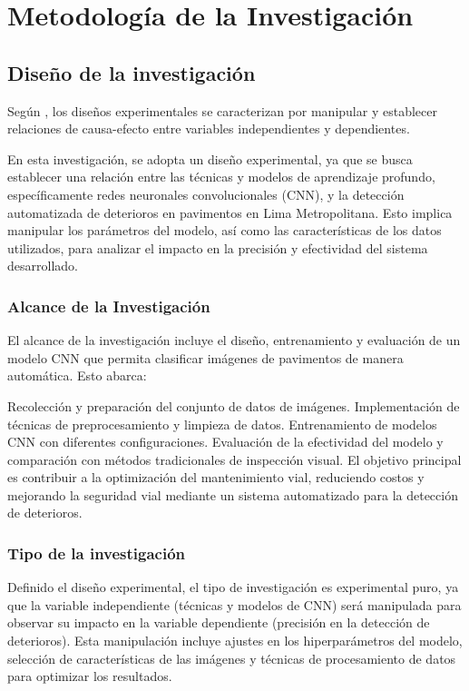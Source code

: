 \chapter{Metodología de la Investigación}



\section{Diseño de la investigación}

Según \cite{bk_sampieri2014metodologia}, los diseños experimentales se caracterizan por manipular y establecer relaciones de causa-efecto entre variables independientes y dependientes.

En esta investigación, se adopta un diseño experimental, ya que se busca establecer una relación entre las técnicas y modelos de aprendizaje profundo, específicamente redes neuronales convolucionales (CNN), y la detección automatizada de deterioros en pavimentos en Lima Metropolitana. Esto implica manipular los parámetros del modelo, así como las características de los datos utilizados, para analizar el impacto en la precisión y efectividad del sistema desarrollado.

\subsection{Alcance de la Investigación}

El alcance de la investigación incluye el diseño, entrenamiento y evaluación de un modelo CNN que permita clasificar imágenes de pavimentos de manera automática. Esto abarca:

Recolección y preparación del conjunto de datos de imágenes.
Implementación de técnicas de preprocesamiento y limpieza de datos.
Entrenamiento de modelos CNN con diferentes configuraciones.
Evaluación de la efectividad del modelo y comparación con métodos tradicionales de inspección visual.
El objetivo principal es contribuir a la optimización del mantenimiento vial, reduciendo costos y mejorando la seguridad vial mediante un sistema automatizado para la detección de deterioros.



\subsection{Tipo de la investigación}

Definido el diseño experimental, el tipo de investigación es experimental puro, ya que la variable independiente (técnicas y modelos de CNN) será manipulada para observar su impacto en la variable dependiente (precisión en la detección de deterioros). Esta manipulación incluye ajustes en los hiperparámetros del modelo, selección de características de las imágenes y técnicas de procesamiento de datos para optimizar los resultados.

